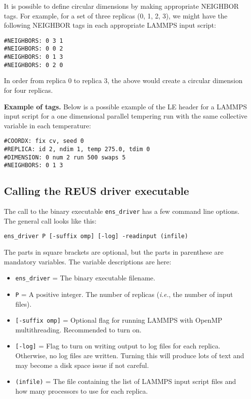 \documentclass[10pt]{article}
\begin{document}
It is possible to define circular dimensions by making appropriate NEIGHBOR tags. For
example, for a set of three replicas (0, 1, 2, 3), we might have the following NEIGHBOR tags
in each appropriate LAMMPS input script:
\begin{verbatim}
#NEIGHBORS: 0 3 1
#NEIGHBORS: 0 0 2
#NEIGHBORS: 0 1 3
#NEIGHBORS: 0 2 0
\end{verbatim}
In order from replica 0 to replica 3, the above would create a circular dimension for four
replicas.


\textbf{Example of tags.}
Below is a possible example of the LE header for a LAMMPS input script for a one dimensional
parallel tempering run with the same collective variable in each temperature:
\begin{verbatim}
#COORDX: fix cv, seed 0
#REPLICA: id 2, ndim 1, temp 275.0, tdim 0
#DIMENSION: 0 num 2 run 500 swaps 5
#NEIGHBORS: 0 1 3
\end{verbatim}

\subsection{Calling the REUS driver executable}\label{ssec:running_REUS}

The call to the binary executable \texttt{ens\_driver} has a few command line options.
The general call looks like this:
\begin{verbatim}
ens_driver P [-suffix omp] [-log] -readinput (infile)
\end{verbatim}
The parts in square brackets are optional, but the parts in parenthese are mandatory variables. 
The variable descriptions are here:
\begin{itemize}
\item	\texttt{ens\_driver} = The binary executable filename.
\item	\texttt{P} = A positive integer. 
		The number of replicas ({\em i.e.}, the number of input files).
\item	\texttt{[-suffix omp]} = Optional flag for running LAMMPS with OpenMP multithreading.
		Recommended to turn on.
\item	\texttt{[-log]} = Flag to turn on writing output to log files for each replica. Otherwise,
		no log files are written. Turning this will produce lots of text and may become a 
		disk space issue if not careful.
\item	\texttt{(infile)} = The file containing the list of LAMMPS input script files and how many
		processors to use for each replica.
\end{itemize}
\end{document}
